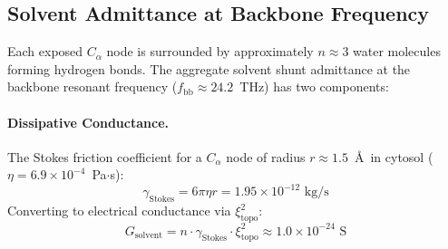 \subsection{Solvent Admittance at Backbone Frequency}

Each exposed $C_\alpha$ node is surrounded by approximately $n \approx 3$ water molecules forming hydrogen bonds. The aggregate solvent shunt admittance at the backbone resonant frequency ($f_\text{bb} \approx 24.2$~THz) has two components:

\paragraph{Dissipative Conductance.}
The Stokes friction coefficient for a $C_\alpha$ node of radius $r \approx 1.5$~\AA\ in cytosol ($\eta = 6.9 \times 10^{-4}$~Pa$\cdot$s):
\begin{equation}
    \gamma_\text{Stokes} = 6\pi\eta r = 1.95 \times 10^{-12} \text{ kg/s}
\end{equation}
Converting to electrical conductance via $\xi_\text{topo}^2$:
\begin{equation}
    G_\text{solvent} = n \cdot \gamma_\text{Stokes} \cdot \xi_\text{topo}^2 \approx 1.0 \times 10^{-24} \text{ S}
\end{equation}

